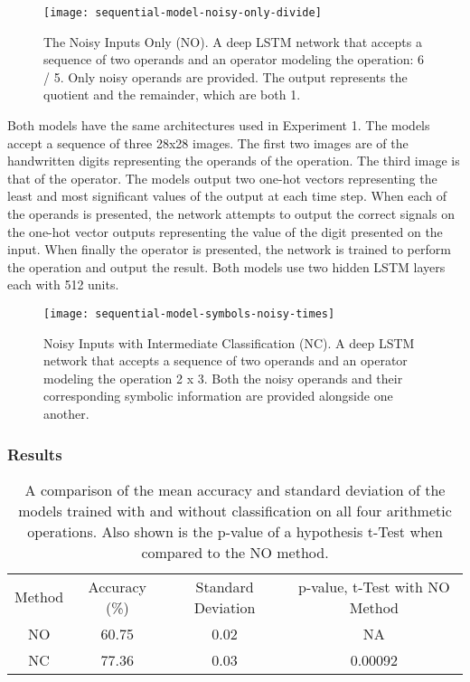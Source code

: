 \begin{figure}[t]
	\centering
	\texttt{[image: sequential-model-noisy-only-divide]}
	\caption{The Noisy Inputs Only (NO). A deep LSTM network that accepts a sequence of two operands and an operator modeling the operation: 6 / 5. Only noisy operands are provided. The output represents the quotient and the remainder, which are both 1.}
	\label{fig:sequential-model-noisy-only-divide}
\end{figure}

Both models have the same architectures used in Experiment 1. The models accept a sequence of three 28x28 images. The first two images are of the handwritten digits representing the operands of the operation. The third image is that of the operator. The models output two one-hot vectors representing the least and most significant values of the output at each time step. When each of the operands is presented, the network attempts to output the correct signals on the one-hot vector outputs representing the value of the digit presented on the input. When finally the operator is presented, the network is trained to perform the operation and output the result. Both models use two hidden LSTM layers each with 512 units.

\begin{figure}[t]
	\centering
	\texttt{[image: sequential-model-symbols-noisy-times]}
	\caption{Noisy Inputs with Intermediate Classification (NC). A deep LSTM network that accepts a sequence of two operands and an operator modeling the operation 2 x 3. Both the noisy operands and their corresponding symbolic information are provided alongside one another.}
	\label{fig:sequential-model-symbols-noisy-times}
\end{figure}

\subsubsection{Results}

\begin{table}[p]
	\center
	\caption{A comparison of the mean accuracy and standard deviation of the models trained with and without classification on all four arithmetic operations. Also shown is the p-value of a hypothesis t-Test when compared to the NO method.}
	\label{tab:experiment-2-results-table}
	\begin{tabular}{ |c|c|c|c| } 
		\hline
		Method & Accuracy (\%) & Standard Deviation  & p-value, t-Test with NO Method\\ 
		NO & 60.75 & 0.02 & NA \\  
		NC & 77.36 & 0.03 & 0.00092\\  
		\hline
	\end{tabular}
\end{table}

